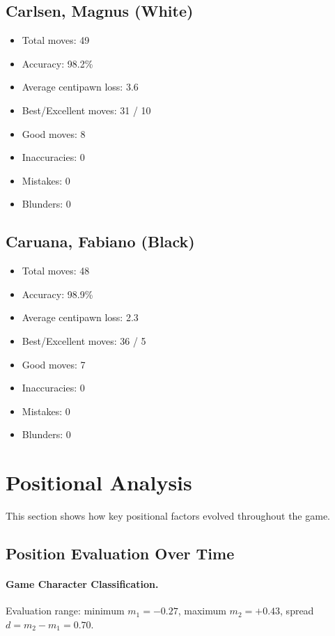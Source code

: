 \documentclass[11pt]{book}
\begin{document}
\subsection{Carlsen, Magnus (White)}
\begin{itemize}
\item Total moves: 49
\item Accuracy: 98.2\%
\item Average centipawn loss: 3.6
\item Best/Excellent moves: 31 / 10
\item Good moves: 8
\item Inaccuracies: 0
\item Mistakes: 0
\item Blunders: 0
\end{itemize}

\subsection{Caruana, Fabiano (Black)}
\begin{itemize}
\item Total moves: 48
\item Accuracy: 98.9\%
\item Average centipawn loss: 2.3
\item Best/Excellent moves: 36 / 5
\item Good moves: 7
\item Inaccuracies: 0
\item Mistakes: 0
\item Blunders: 0
\end{itemize}

\section{Positional Analysis}

This section shows how key positional factors evolved throughout the game.

\subsection{Position Evaluation Over Time}

\paragraph{Game Character Classification.}
Evaluation range: minimum $m_1 = -0.27$, maximum $m_2 = +0.43$, spread $d = m_2 - m_1 = 0.70$.
\end{document}
